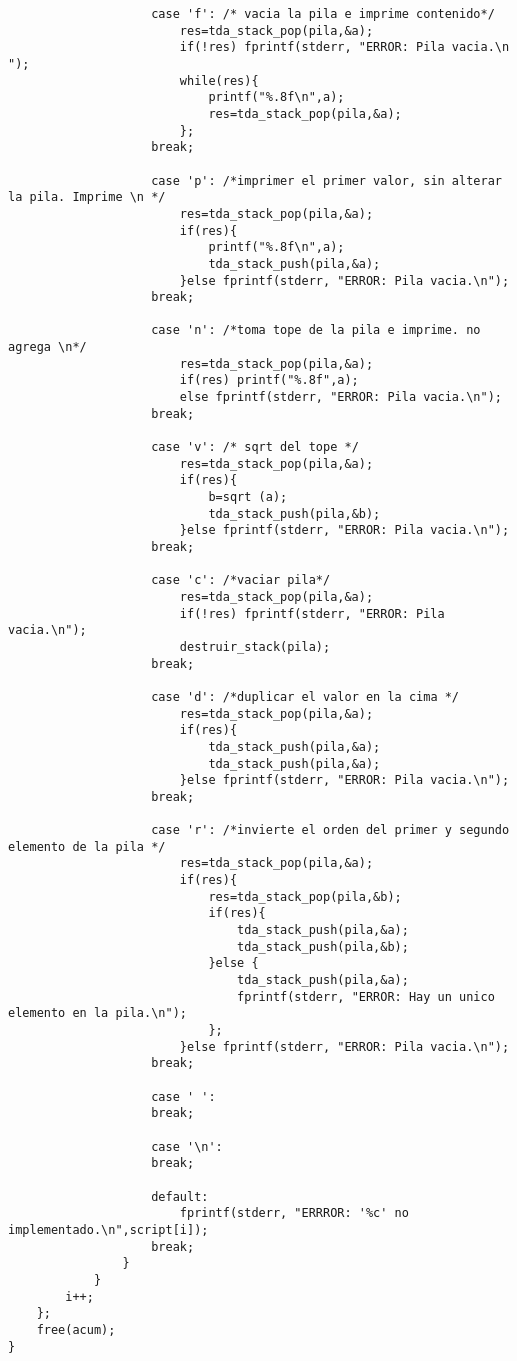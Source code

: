 \documentclass[a4paper,10pt]{article}
\begin{document}
\begin{verbatim}
					case 'f': /* vacia la pila e imprime contenido*/
						res=tda_stack_pop(pila,&a);
						if(!res) fprintf(stderr, "ERROR: Pila vacia.\n ");
						while(res){
							printf("%.8f\n",a);
							res=tda_stack_pop(pila,&a);
						};
					break;

					case 'p': /*imprimer el primer valor, sin alterar la pila. Imprime \n */
						res=tda_stack_pop(pila,&a);
						if(res){
							printf("%.8f\n",a);
							tda_stack_push(pila,&a);
						}else fprintf(stderr, "ERROR: Pila vacia.\n");
					break;

					case 'n': /*toma tope de la pila e imprime. no agrega \n*/
						res=tda_stack_pop(pila,&a);
						if(res) printf("%.8f",a);
						else fprintf(stderr, "ERROR: Pila vacia.\n");
					break;

					case 'v': /* sqrt del tope */
						res=tda_stack_pop(pila,&a);
						if(res){
							b=sqrt (a);
							tda_stack_push(pila,&b);
						}else fprintf(stderr, "ERROR: Pila vacia.\n");
					break;
	
					case 'c': /*vaciar pila*/
						res=tda_stack_pop(pila,&a);
						if(!res) fprintf(stderr, "ERROR: Pila vacia.\n");
						destruir_stack(pila);
					break;
	
					case 'd': /*duplicar el valor en la cima */
						res=tda_stack_pop(pila,&a);
						if(res){
							tda_stack_push(pila,&a);
							tda_stack_push(pila,&a);
						}else fprintf(stderr, "ERROR: Pila vacia.\n");
					break;
	
					case 'r': /*invierte el orden del primer y segundo elemento de la pila */
						res=tda_stack_pop(pila,&a);
						if(res){
							res=tda_stack_pop(pila,&b);
							if(res){
								tda_stack_push(pila,&a);
								tda_stack_push(pila,&b);
							}else {
								tda_stack_push(pila,&a);
								fprintf(stderr, "ERROR: Hay un unico elemento en la pila.\n");
							};
						}else fprintf(stderr, "ERROR: Pila vacia.\n");
					break;
	
					case ' ':
					break;
	
					case '\n':
					break;

					default:
						fprintf(stderr, "ERRROR: '%c' no implementado.\n",script[i]);
					break;
				}
			}
		i++;
	};
	free(acum);
}
\end{verbatim}
\end{document}
